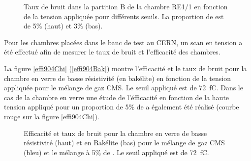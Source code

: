 \begin{figure}[ht!]
	\centering
	\hfill
	\caption{Taux de bruit dans la partition B de la chambre RE1/1 en fonction de la tension appliquée pour différents seuils. La proportion de  est de 5\% (haut) et 3\% (bas).}
    \label{bruitB2}
\end{figure}  
  
Pour les chambres placées dans le banc de test au CERN, un scan en tension a été effectué afin de mesurer le taux de bruit et l'efficacité des chambres.

La figure \ref{effi904Chi} (\ref{effi904Bak}) montre l'efficacité et le taux de bruit pour la chambre en verre de basse résistivité (en bakélite) en fonction de la tension appliquée pour le mélange de gaz CMS. Le seuil appliqué est de \SI{72}{\femto\coulomb}. Dans le cas de la chambre en verre une étude de l'éfficacité en fonction de la haute tension appliqué pour un proportion de 5\% de  a également été réalisé (courbe rouge sur la figure \ref{effi904Chi}).
 
\begin{figure}[ht!]
	\centering
	\hfill
	\caption{Efficacité et taux de bruit pour la chambre en verre de basse résistivité (haut) et en Bakélite (bas) pour le mélange de gaz CMS (bleu) et le mélange à 5\% de . Le seuil appliqué est de \SI{72}{\femto\coulomb}.}
\end{figure}  

